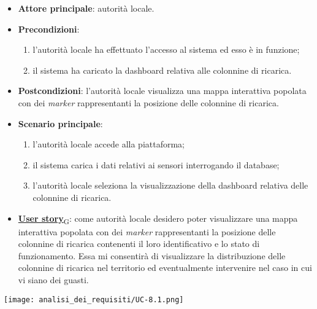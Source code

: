 \begin{itemize}
	\item \textbf{Attore principale}: autorità locale.
	\item \textbf{Precondizioni}:
	      \begin{enumerate}
		      \item l'autorità locale ha effettuato l'accesso al sistema ed esso è in funzione;
		      \item il sistema ha caricato la dashboard relativa alle colonnine di ricarica.
	      \end{enumerate}
	\item \textbf{Postcondizioni}: l'autorità locale visualizza una mappa interattiva popolata con dei \textit{marker} rappresentanti la posizione delle colonnine di ricarica.
	\item \textbf{Scenario principale}:
	      \begin{enumerate}
		      \item l'autorità locale accede alla piattaforma;
		      \item il sistema carica i dati relativi ai sensori interrogando il database;
		      \item l'autorità locale seleziona la visualizzazione della dashboard relativa delle colonnine di ricarica.
	      \end{enumerate}
	\item \href{https://7last.github.io/docs/rtb/documentazione-interna/glossario\#user-story}{\textbf{User story}\textsubscript{G}}:
	      come autorità locale desidero poter visualizzare una mappa interattiva popolata con dei \textit{marker} rappresentanti la posizione delle colonnine di ricarica
	      contenenti il loro identificativo e lo stato di funzionamento. Essa mi consentirà di visualizzare la distribuzione delle colonnine di ricarica nel territorio
	      ed eventualmente intervenire nel caso in cui vi siano dei guasti.
\end{itemize}
\begin{center}
	\texttt{[image: analisi\_dei\_requisiti/UC-8.1.png]}
\end{center}



